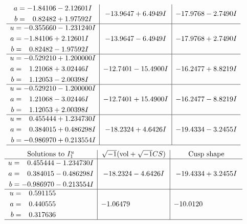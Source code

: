 \documentclass[1p]{elsarticle_modified}
\theoremstyle{definition}
\newcommand{\I}{\sqrt{-1}}
\begin{document}
$$\begin{array}{c|c|c}
\begin{aligned}
a &= -1.84106 - 2.12601 I \\
b &= \phantom{-}0.82482 + 1.97592 I\end{aligned}
 & -13.9647 + 6.4949 I & -17.9768 - 2.7490 I \\ \hline\begin{aligned}
u &= -0.355660 - 1.231240 I \\
a &= -1.84106 + 2.12601 I \\
b &= \phantom{-}0.82482 - 1.97592 I\end{aligned}
 & -13.9647 - 6.4949 I & -17.9768 + 2.7490 I \\ \hline\begin{aligned}
u &= -0.529210 + 1.200000 I \\
a &= \phantom{-}1.21068 + 3.02446 I \\
b &= \phantom{-}1.12053 - 2.00398 I\end{aligned}
 & -12.7401 - 15.4900 I & -16.2477 + 8.8219 I \\ \hline\begin{aligned}
u &= -0.529210 - 1.200000 I \\
a &= \phantom{-}1.21068 - 3.02446 I \\
b &= \phantom{-}1.12053 + 2.00398 I\end{aligned}
 & -12.7401 + 15.4900 I & -16.2477 - 8.8219 I \\ \hline\begin{aligned}
u &= \phantom{-}0.455444 + 1.234730 I \\
a &= \phantom{-}0.384015 + 0.486298 I \\
b &= -0.986970 + 0.213554 I\end{aligned}
 & -18.2324 + 4.6426 I & -19.4334 - 3.2455 I\\
 \hline 
 \end{array}$$\newpage$$\begin{array}{c|c|c}  
\text{Solutions to }I^u_{1}& \I (\text{vol} + \sqrt{-1}CS) & \text{Cusp shape}\\
 \hline 
\begin{aligned}
u &= \phantom{-}0.455444 - 1.234730 I \\
a &= \phantom{-}0.384015 - 0.486298 I \\
b &= -0.986970 - 0.213554 I\end{aligned}
 & -18.2324 - 4.6426 I & -19.4334 + 3.2455 I \\ \hline\begin{aligned}
u &= \phantom{-}0.591155\phantom{ +0.000000I} \\
a &= \phantom{-}0.440555\phantom{ +0.000000I} \\
b &= \phantom{-}0.317636\phantom{ +0.000000I}\end{aligned}
 & -1.06479\phantom{ +0.000000I} & -10.0120\phantom{ +0.000000I}\\
 \hline 
 \end{array}$$\newpage\newpage\renewcommand{\arraystretch}{1}
\end{document}
